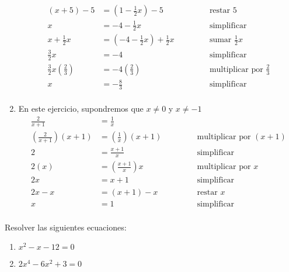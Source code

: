 \documentclass[11pt,a4]{aleph-examen}
\begin{document}
\begin{preguntas}
\begin{respuesta}
\begin{enumerate}[label=\textit{\alph*)}]
$$\begin{aligned}
            (x+5) - 5 &= \left( 1 - \frac{1}{2}x \right) - 5 
            &\hspace{1cm}& \text{ restar }5 \\
            x  &= -4 - \frac{1}{2}x 
            && \text{ simplificar } \\
            x + \frac{1}{2}x &= \left(-4 - \frac{1}{2}x \right) + \frac{1}{2}x 
            && \text{ sumar } \frac{1}{2}x \\
            \frac{3}{2}x &= -4 
            && \text{ simplificar } \\
            \frac{3}{2}x \left( \frac{2}{3} \right) &= -4\left( \frac{2}{3} \right) 
            && \text{ multiplicar por } \frac{2}{3} \\
            x &= -\frac{8}{3} 
            && \text{ simplificar } \\
        \end{aligned}
        $$
        \item En este ejercicio, supondremos que $x \neq 0$ y $x \neq -1$
        $$
        \begin{aligned}
            \frac{2}{x+1} &= \frac{1}{x} \\
            \left( \frac{2}{x+1} \right) (x+1)&= \left( \frac{1}{x} \right) (x+1) 
            &\hspace{1cm}& \text{ multiplicar por }(x+1) \\
            2  &= \frac{x+1}{x} 
            && \text{ simplificar } \\
            2 (x) &= \left(\frac{x+1}{x} \right) x 
            && \text{ multiplicar por } x \\
            2x &= x+1 
            && \text{ simplificar } \\
            2x - x &= (x+1)-x 
            && \text{ restar } x \\
            x &= 1 
            && \text{ simplificar } \\
        \end{aligned}
        $$
    \end{enumerate}
\end{respuesta}
\item Resolver las siguientes ecuaciones:
\begin{multicols}{2}
    \begin{enumerate}[label=\textit{\alph*)}]
        \item $x^2 - x - 12 = 0$
        \item $2x^4 - 6x^2 + 3= 0$

\end{enumerate}
\end{multicols}
\end{preguntas}
\end{document}
